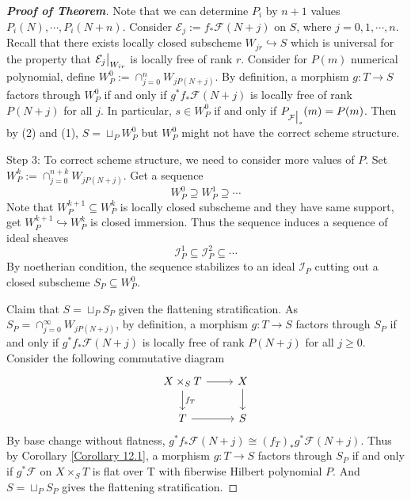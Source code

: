 \documentclass{ctexart}
\begin{document}
\begin{proof}[\textbf{\emph{Proof of Theorem}}]
    Note that we can determine $P_{i}$ by $n + 1$ values $P_{i}(N), \cdots, P_{i}(N + n)$.
    Consider $\mathcal{E}_{j} := f_{\ast}\mathcal{F}(N + j)$ on $S$, where $j = 0, 1, \cdots, n$.
    Recall that there exists locally closed subscheme $W_{jr} \hookrightarrow S$ which is universal for the property that $\mathcal{E}_{j}\big{|}_{W_{ir}}$ is locally free of rank $r$.
    Consider for $P(m)$ numerical polynomial, define $W_{P}^{0} := \cap_{j = 0}^{n} W_{jP(N + j)}$.
    By definition, a morphism $g: T \longrightarrow S$ factors through $W_{P}^{0}$ if and only if $g^{\ast}f_{\ast}\mathcal{F}(N + j)$ is locally free of rank $P(N + j)$ for all $j$.
    In particular, $s\in W_{P}^{0}$ if and only if $P_{\mathcal{F}\big{|}_{s}}(m) = P(m)$.
    Then by (2) and (1), $S = \sqcup_{P} W_{P}^{0}$ but $W_{P}^{0}$ might not have the correct scheme structure.
    \par
    Step 3: To correct scheme structure, we need to consider more values of $P$.
    Set $W_{P}^{k} := \cap_{j = 0}^{n + k} W_{jP(N + j)}$.
    Get a sequence
    \begin{equation*}
        W_{P}^{0} \supseteq W_{P}^{1} \supseteq \cdots
    \end{equation*}
    Note that $W_{P}^{k + 1} \subseteq W_{P}^{k}$ is locally closed subscheme and they have same support, get $W_{P}^{k + 1} \hookrightarrow W_{P}^{k}$ is closed immersion.
    Thus the sequence induces a sequence of ideal sheaves
    \begin{equation*}
        \mathcal{I}_{P}^{1} \subseteq \mathcal{I}_{P}^{2} \subseteq \cdots
    \end{equation*}
    By noetherian condition, the sequence stabilizes to an ideal $\mathcal{I}_{P}$ cutting out a closed subscheme $S_{P} \subseteq W_{P}^{0}$.
    \par
    Claim that $S = \sqcup_{P} S_{P}$ given the flattening stratification.
    As $S_{P} = \cap_{j = 0}^{\infty} W_{jP(N + j)}$, by definition, a morphism $g: T \longrightarrow S$ factors through $S_{P}$ if and only if $g^{\ast}f_{\ast}\mathcal{F}(N + j)$ is locally free of rank $P(N + j)$ for all $j \ge 0$.
    Consider the following commutative diagram
    \begin{equation*}
        \begin{tikzcd}
            X \times_{S} T \arrow[r] \arrow[d, "f_{T}"] &
            X \arrow[d] \\
            T \arrow[r] &
            S
        \end{tikzcd}
    \end{equation*}
    By base change without flatness, $g^{\ast}f_{\ast}\mathcal{F}(N + j) \cong (f_{T})_{\ast}g^{\ast}\mathcal{F}(N + j)$.
    Thus by Corollary \ref{Corollary 12.1}, a morphism $g: T \longrightarrow S$ factors through $S_{P}$ if and only if $g^{\ast}\mathcal{F}$ on $X \times_{S} T$ is flat over T with fiberwise Hilbert polynomial $P$.
    And $S = \sqcup_{P} S_{P}$ gives the flattening stratification.
\end{proof}
\end{document}
